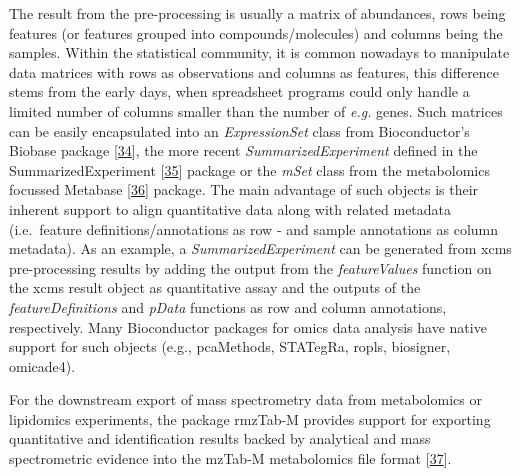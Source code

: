 \documentclass[]{article}
\begin{document}
The result from the pre-processing is usually a matrix of abundances, rows being features (or features grouped into compounds/molecules) and columns being the samples. Within the statistical community, it is common nowadays to manipulate data matrices with rows as observations and columns as features, this difference stems from the early days, when spreadsheet programs could only handle a limited number of columns smaller than the number of \emph{e.g.} genes. Such matrices can be easily encapsulated into an \emph{ExpressionSet} class from Bioconductor's Biobase package {[}\protect\hyperlink{ref-huber_2015}{34}{]}, the more recent \emph{SummarizedExperiment} defined in the SummarizedExperiment {[}\protect\hyperlink{ref-martinmorgan_2017}{35}{]} package or the \emph{mSet} class from the metabolomics focussed Metabase {[}\protect\hyperlink{ref-zhu_website_2019}{36}{]} package. The main advantage of such objects is their inherent support to align quantitative data along with related metadata (i.e.~feature definitions/annotations as row - and sample annotations as column metadata). As an example, a \emph{SummarizedExperiment} can be generated from xcms pre-processing results by adding the output from the \emph{featureValues} function on the xcms result object as quantitative assay and the outputs of the \emph{featureDefinitions} and \emph{pData} functions as row and column annotations, respectively. Many Bioconductor packages for omics data analysis have native support for such objects (e.g., pcaMethods, STATegRa, ropls, biosigner, omicade4).

For the downstream export of mass spectrometry data from metabolomics or lipidomics experiments, the package rmzTab-M provides support for exporting quantitative and identification results backed by analytical and mass spectrometric evidence into the mzTab-M metabolomics file format {[}\protect\hyperlink{ref-hoffmann_2019}{37}{]}.
\end{document}
